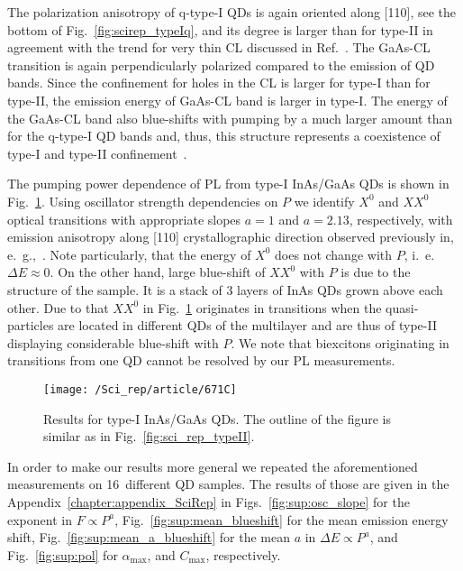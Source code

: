 The polarization anisotropy of q-type-I QDs is again oriented along [110], see the bottom of Fig.~\ref{fig:scirep_typeIq}, and its degree is larger than for type-II in agreement with the trend for very thin CL discussed in Ref.~\citep{Klenovsky2017}. The GaAs-CL transition is again perpendicularly polarized compared to the emission of QD bands. Since the confinement for holes in the CL is larger for type-I than for type-II, the emission energy of GaAs-CL band is larger in type-I. The energy of the GaAs-CL band also blue-shifts with pumping by a much larger amount than for the q-type-I QD bands and, thus, this structure represents a coexistence of type-I and type-II confinement~\cite{Ji2015}.


The pumping power dependence of PL from type-I InAs/GaAs QDs is shown in Fig.~\ref{fig:671C}. Using oscillator strength dependencies on $P$ we identify  $X^0$ and $XX^0$ optical transitions with appropriate slopes $a=1$ and $a=2.13$, respectively, with emission anisotropy along [110] crystallographic direction observed previously in, e.~g.,~\citep{HumPhysE}. Note particularly, that the energy of $X^0$ does not change with $P$, i.~e. $\Delta E\approx 0$. On the other hand, large blue-shift of $XX^0$ with $P$ is due to the structure of the sample. It is a stack of 3 layers of InAs QDs grown above each other. Due to that $XX^0$ in Fig.~\ref{fig:671C} originates in transitions when the quasi-particles are located in different QDs of the multilayer and are thus of type-II displaying considerable blue-shift with $P$. We note that biexcitons originating in transitions from one QD cannot be resolved by our PL measurements.
%
\begin{figure}
	\centering
	\texttt{[image: /Sci\_rep/article/671C]}
	\caption{Results for type-I InAs/GaAs QDs. The outline of the figure is similar as in Fig.~\ref{fig:sci_rep_typeII}.}
	\label{fig:671C}
\end{figure}

In order to make our results more general we repeated the aforementioned measurements on 16~different QD samples. The results of those are given in the Appendix~\ref{chapter:appendix_SciRep} in Figs.~\ref{fig:sup:osc_slope} for the exponent in $F\propto P^a$, Fig.~\ref{fig:sup:mean_blueshift} for the mean emission energy shift, Fig.~\ref{fig:sup:mean_a_blueshift} for the mean $a$ in $\Delta E \propto P^a$, and Fig.~\ref{fig:sup:pol} for $\alpha_{\mathrm{max}}$, and $C_{\mathrm{max}}$, respectively.
\newpage 





